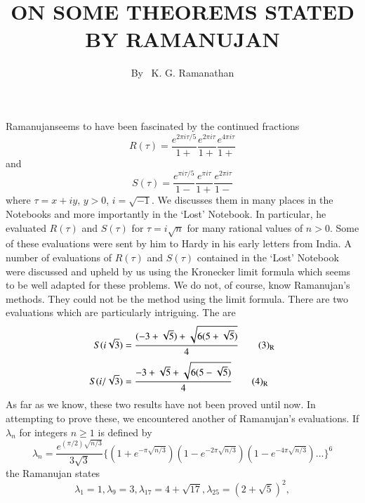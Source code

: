 \title{ON SOME THEOREMS STATED BY RAMANUJAN}

\author{By~ K. G. Ramanathan}

\date{}
\maketitle

\setcounter{pageoriginal}{150}
\section{}\label{art9-sec1}
Ramanujan\pageoriginale seems to have been fascinated by the continued fractions 
\begin{equation}
R(\tau)=\frac{e^{2\pi i\tau/5}}{1+}\frac{e^{2\pi i\tau}}{1+}\frac{e^{4\pi i\tau}}{1+}\label{art09-eq1}
\end{equation}
and
\begin{equation}
S(\tau)=\dfrac{e^{\pi i\tau/5}}{1-}\dfrac{e^{\pi i\tau}}{1+}\dfrac{e^{2\pi i\tau}}{1-}
\end{equation}
where $\tau=x+iy$, $y>0$, $i=\sqrt{-1}$. We discusses them in many places in the Notebooks and more importantly in the `Lost' Notebook. In particular, he evaluated $R(\tau)$ and $S(\tau)$ for $\tau=i\sqrt{n}$ for many rational values of $n>0$. Some of these evaluations were sent by him to Hardy in his early letters from India. A number of evaluations of $R(\tau)$ and $S(\tau)$ contained in the `Lost' Notebook were discussed and upheld by us \cite{art09-key4} using the Kronecker limit formula which seems to be well adapted for these problems. We do not, of course, know Ramanujan's methods. They could not be the method using the limit formula. There are two evaluations \cite[p. 46]{art09-key7} which are particularly intriguing. The are 
\begin{align*}
S(i\sqrt{3}) &= \frac{(-3+\sqrt{5})+\sqrt{6(5+\sqrt{5})}}{4}\tag*{(3)$_{\text{R}}$}\label{art08-eq3R}\\[3pt]
S(i/\sqrt{3}) &=\frac{-3+\sqrt{5}+\sqrt{6(5-\sqrt{5})}}{4}\tag*{(4)$_{\text{R}}$}\label{art08-eq4R}
\end{align*}
As far as we know, these two results have not been proved until now. In attempting to prove these, we encountered another of Ramanujan's evaluations. If $\lambda_{n}$ for integers $n\geq 1$ is defined by
$$
\lambda_{n}=\dfrac{e^{(\pi/2)\sqrt{n/3}}}{3\sqrt{3}}\{(1+e^{-\pi\sqrt{n/3}})(1-e^{-2\pi\sqrt{n/3}})(1-e^{-4\pi\sqrt{n/3}})\ldots\}^{6}
$$
the Ramanujan states
$$
\lambda_{1}=1, \lambda_{9}=3, \lambda_{17}=4+\sqrt{17}, \lambda_{25}=(2+\sqrt{5})^{2},
$$

